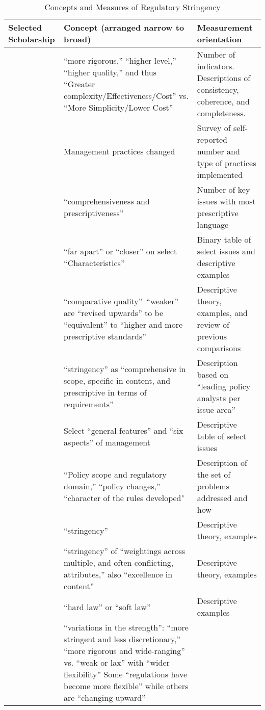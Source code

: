 \begin{table}
\caption{Concepts and Measures of Regulatory Stringency}
\label{review}
\footnotesize
\centering

\begin{tabular}{p{3.3cm}p{7.5cm}p{4.5cm}}
Selected Scholarship & Concept (arranged narrow to broad) &    Measurement orientation \\
\hline
\citet{Garcia-Montiel2017}&
“more rigorous,” “higher level,” “higher quality,” and thus “Greater complexity/Effectiveness/Cost” vs. “More Simplicity/Lower Cost”&
Number of indicators. Descriptions of consistency, coherence, and completeness.\\
\hline
\citet{Moore2012}&
Management practices changed &    
Survey of self-reported number and type of practices implemented\\
\hline
\citet{McDermott2010} &
“comprehensiveness and prescriptiveness”&
Number of key issues with most prescriptive language\\
\hline
\citet{Overdevest2014}&
“far apart” or “closer” on select “Characteristics”&
Binary table of select issues and descriptive examples\\
\hline
\citet{Overdevest2010}&
“comparative quality”--“weaker” are “revised upwards” to be “equivalent” to “higher and more prescriptive standards”&
Descriptive theory, examples, and review of previous comparisons\\
\hline
\citet{Fransen2011}&
“stringency” as “comprehensive in scope, specific in content, and prescriptive in terms of requirements”&
Description based on “leading policy analysts per issue area”\\
\hline
\citet{Hansen2006}&
Select “general features” and “six aspects” of management &
Descriptive table of select issues\\
\hline
\citet{Auld2014}&    
“Policy scope and regulatory domain,” “policy changes,” “character of the rules developed"&
Description of the set of problems addressed and how\\
\hline
\citet{Cashore2004}&    
“stringency”&
Descriptive theory, examples\\
\hline
\citet{Smith2010}&
 “stringency” of “weightings across multiple, and often conflicting, attributes,” also “excellence in content”&
Descriptive theory, examples\\
\hline
\citet{Porter2014}&
“hard law” or “soft law”&
Descriptive examples\\
\hline
\citet{Gulbrandsen2004}&
“variations in the strength”: “more stringent and less discretionary,” “more rigorous and wide-ranging” vs. “weak or lax” with “wider flexibility” Some “regulations have become more flexible” while others are “changing upward”&

\end{tabular}
\end{table}

